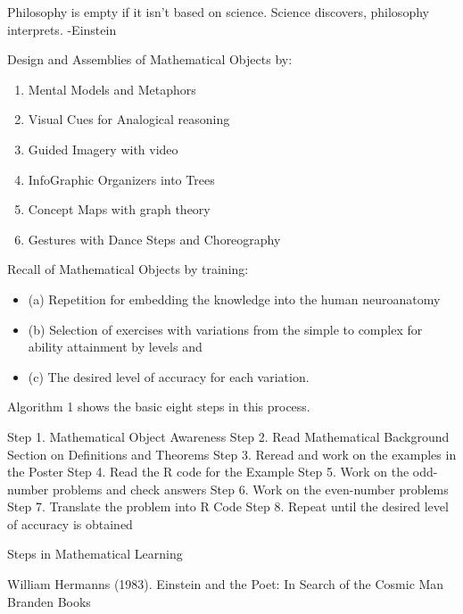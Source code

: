 \documentclass[preprint, 12pt]{elsarticle}
\theoremstyle{definition}
\begin{document}
Philosophy is empty if it isn't based on science. Science discovers, philosophy interprets. -Einstein \cite{key1}  

Design and Assemblies of Mathematical Objects by:

\begin{enumerate} \itemsep -2pt
	\item Mental Models and Metaphors
	\item Visual Cues for Analogical reasoning
	\item Guided Imagery with video
	\item InfoGraphic Organizers into Trees
	\item Concept Maps with graph theory
	\item Gestures with Dance Steps and Choreography  
\end{enumerate}

Recall of Mathematical Objects by training:

\begin{itemize} \itemsep -2pt
	\item (a) Repetition for embedding the knowledge into the human neuroanatomy
	\item (b) Selection of exercises with variations from the simple to complex for ability attainment by levels and 
	\item (c) The desired level of accuracy for each variation. 
\end{itemize} 

Algorithm 1 shows the basic eight steps in this process.

\begin{algorithm}[H]
	\begin{algorithmic}[1]
		\State Step 1. Mathematical Object Awareness 
		\State Step 2. Read Mathematical Background Section on Definitions and Theorems
		\State Step 3. Reread and work on the examples in the Poster
		\State Step 4. Read the R code for the Example
		\State Step 5. Work on the odd-number problems and check answers
		\State Step 6. Work on the even-number problems
		\State Step 7. Translate the problem into R Code
		\State Step 8. Repeat until the desired level of accuracy is obtained
	\end{algorithmic}
	\caption{Steps in Mathematical Learning}
	\label{Mathematical Learning}
\end{algorithm}


\begin{thebibliography}{00}


 William Hermanns (1983). 
\newblock Einstein and the Poet: In Search of the Cosmic Man
\newblock Branden Books


\end{thebibliography}
\end{document}
